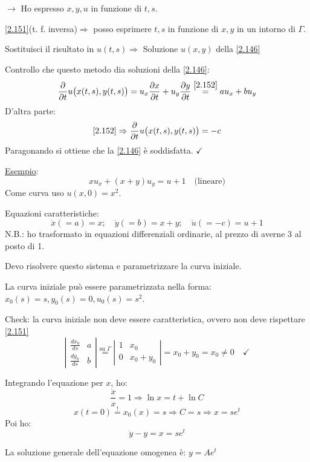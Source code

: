 \documentclass[a4paper,11pt]{report}
\begin{document}
$\rightarrow$ Ho espresso $x,y,u$ in funzione di $t,s$.

\eqref{2.151}(t. f. inversa)${\Rightarrow}$ posso esprimere $t,s$ in funzione di $x,y$ in un intorno di $\Gamma$.

Sostituisci il risultato in $u(t,s)\Rightarrow$ Soluzione $u(x,y)$ della \eqref{2.146}

Controllo che questo metodo dia soluzioni della \eqref{2.146}:
\[
\frac{\partial}{\partial t}u \big(x(t,s),y(t,s) \big)=u_x \frac{\partial x}{\partial t} + u_y \frac{\partial y}{\partial t}\overset{\eqref{2.152}}{=}au_x + bu_y
\]
D'altra parte:
\[
\eqref{2.152} \Rightarrow  \frac{\partial }{\partial t} u\big( x(t,s),y(t,s) \big)=-c
\]
Paragonando si ottiene che la \eqref{2.146} \`e soddisfatta. $\checkmark$

\medskip

\underline{Esempio}:
\[
xu_x + (x+y)u_y = u+1\quad \text{(lineare)}
\]
Come curva uso $u(x,0)=x^2$. 

Equazioni caratteristiche:
\[
\dot{x}(=a)=x; \quad \dot{y}(=b)=x+y; \quad \dot{u}(=-c)=u+1
\]
N.B.: ho trasformato in equazioni differenziali ordinarie, al prezzo di averne 3 al posto di 1.

Devo risolvere questo sistema e parametrizzare la curva iniziale.

La curva iniziale pu\`o essere parametrizzata nella forma: $x_0(s)=s, y_0(s)=0, u_0(s)=s^2$. 

Check: la curva iniziale non deve essere caratteristica, ovvero non deve rispettare \eqref{2.151}
\[
\left|\begin{matrix}
\frac{dx_0}{ds} & a \\
\frac{dy_0}{ds} & b
\end{matrix}\right| \overset{\text{su }\Gamma}{=} \left| \begin{matrix}
1 & x_0 \\
0 & x_0+y_0
\end{matrix} \right| = x_0 + y_0 = x_0 \neq 0 \quad \checkmark
\]

Integrando l'equazione per $x$, ho:
\[
\frac{\dot{x}}{x}=1 \Rightarrow \ln x = t + \ln C
\]
\[
x(t=0)\overset{!}{=}x_0(x) =s \Rightarrow C=s \Rightarrow x=se^t
\]
Poi ho:
\[
\dot{y}-y=x=se^t
\]

La soluzione generale dell'equazione omogenea \`e: $y=Ae^t$
\end{document}

